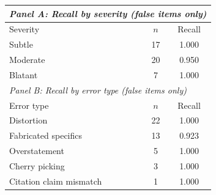 \begin{tabular}{lcc}
\toprule
\multicolumn{3}{l}{\textit{Panel A: Recall by severity (false items only)}} \\
\midrule
 Severity & $n$ & Recall \\
\midrule
 Subtle & 17 & 1.000 \\
 Moderate & 20 & 0.950 \\
 Blatant & 7 & 1.000 \\
\midrule
\multicolumn{3}{l}{\textit{Panel B: Recall by error type (false items only)}} \\
\midrule
 Error type & $n$ & Recall \\
\midrule
 Distortion & 22 & 1.000 \\
 Fabricated specifics & 13 & 0.923 \\
 Overstatement & 5 & 1.000 \\
 Cherry picking & 3 & 1.000 \\
 Citation claim mismatch & 1 & 1.000 \\
\bottomrule
\end{tabular}
